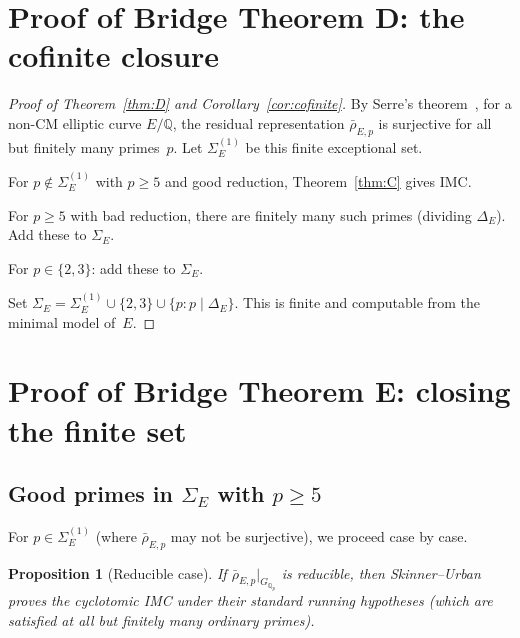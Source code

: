 \documentclass[11pt]{amsart}
\newtheorem{proposition}[theorem]{Proposition}
\theoremstyle{definition}
\theoremstyle{remark}
\newcommand{\Q}{\mathbb{Q}}
\newcommand{\Qp}{\mathbb{Q}_p}
\begin{document}
\section{Proof of Bridge Theorem D: the cofinite closure}
\label{sec:cofinite}

\begin{proof}[Proof of Theorem~\ref{thm:D} and Corollary~\ref{cor:cofinite}]
By Serre's theorem~\cite{Serre}, for a non-CM elliptic curve
$E/\Q$, the residual representation $\bar\rho_{E,p}$ is surjective
for all but finitely many primes~$p$.  Let $\Sigma_E^{(1)}$ be
this finite exceptional set.

For $p\notin\Sigma_E^{(1)}$ with $p\ge 5$ and good reduction,
Theorem~\ref{thm:C} gives IMC.

For $p\ge 5$ with bad reduction, there are finitely many such
primes (dividing $\Delta_E$).  Add these to $\Sigma_E$.

For $p\in\{2,3\}$: add these to $\Sigma_E$.

Set $\Sigma_E=\Sigma_E^{(1)}\cup\{2,3\}\cup\{p: p\mid\Delta_E\}$.
This is finite and computable from the minimal model of~$E$.
\end{proof}

\section{Proof of Bridge Theorem E: closing the finite set}
\label{sec:closing}

\subsection{Good primes in $\Sigma_E$ with $p\ge 5$}

For $p\in\Sigma_E^{(1)}$ (where $\bar\rho_{E,p}$ may not be
surjective), we proceed case by case.

\begin{proposition}[Reducible case]\label{prop:reducible}
If $\bar\rho_{E,p}|_{G_{\Qp}}$ is reducible, then
Skinner--Urban~\textup{\cite{SU}} proves the cyclotomic IMC
under their standard running hypotheses \textup{(}which are
satisfied at all but finitely many ordinary primes\textup{)}.
\end{proposition}
\end{document}
